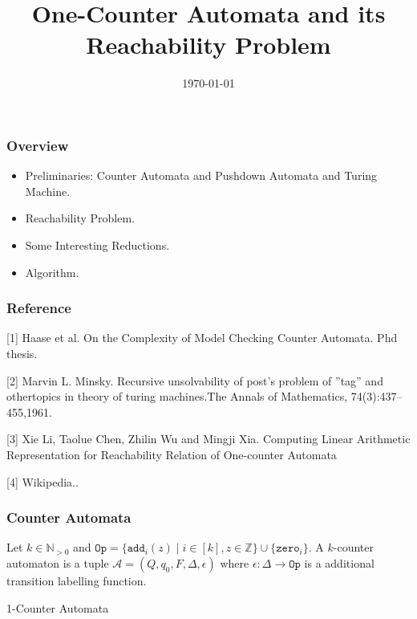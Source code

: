 \documentclass[11pt]{beamer}
\title{One-Counter Automata and its Reachability Problem}
\date{\today}
\begin{document}
\maketitle
\begin{frame}\frametitle{Overview }
\begin{itemize}
\item Preliminaries: Counter Automata and Pushdown Automata and Turing Machine.


\item Reachability Problem.

\item Some Interesting Reductions.


\item Algorithm.

           
\end{itemize}
\end{frame}

\begin{frame}\frametitle{Reference}
[1] Haase et al. On the Complexity of Model Checking Counter Automata. Phd thesis.

[2] Marvin L. Minsky. Recursive unsolvability of post’s problem of ”tag” and othertopics in theory of turing machines.The Annals of Mathematics, 74(3):437–455,1961.

[3] Xie Li, Taolue Chen, Zhilin Wu and Mingji Xia. Computing Linear Arithmetic Representation for Reachability Relation of One-counter Automata

[4] Wikipedia..
\end{frame}

\begin{frame}\frametitle{Counter Automata}
\begin{definition}

Let $k\in \mathbb{N}_{>0}$ and $\texttt{Op} = \{\texttt{add}_i(z)\mid i\in[k], z\in \mathbb{Z}\} \cup \{\texttt{zero}_i\}$. A $k$-counter automaton is a tuple $\mathcal{A} = (Q, q_0, F, \Delta, \epsilon)$ where $\epsilon: \Delta \rightarrow \texttt{Op}$ is a additional transition labelling function.


\end{definition}

\begin{example}{1-Counter Automata}



\end{example}\hspace{5000pt}
\end{frame}
\end{document}
